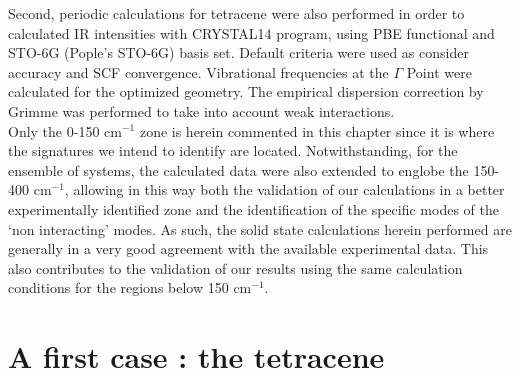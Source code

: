 Second, periodic calculations for tetracene were also performed in order to calculated IR intensities with CRYSTAL14 program\cite{dovesi2014crystal14}, using PBE functional and STO-6G (Pople's STO-6G) basis set. Default criteria were used as consider accuracy and SCF convergence. Vibrational frequencies at the $\Gamma$ Point were calculated for the optimized geometry. The empirical dispersion correction by Grimme \cite{grimme2006semiempirical} was performed to take into account weak interactions. \\

Only the 0-150 cm$^{-1}$ zone is herein commented in this chapter since it is where the signatures we intend to identify are located. Notwithstanding, for the ensemble of systems, the calculated data were also extended to englobe the 150-400 cm$^{-1}$, allowing in this way both the validation of our calculations in a better experimentally identified zone and the identification of the specific modes of the ‘non interacting’ modes. As such, the solid state calculations herein performed are generally in a very good agreement with the available experimental data. This also contributes to the validation of our results using the same calculation conditions for the regions below 150 cm$^{-1}$.\\




\section{A first case : the tetracene}

